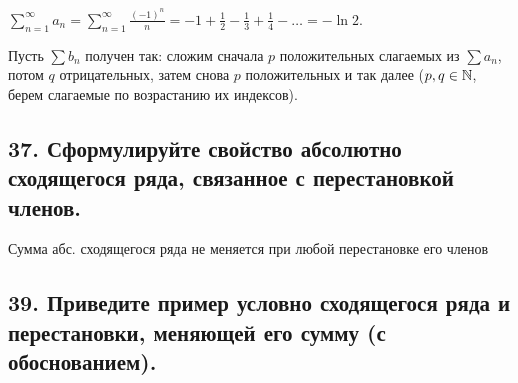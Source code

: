 \documentclass[a4paper, fleqn]{article}
\begin{document}
    $\displaystyle \sum_{n = 1}^{\infty} a_n = \sum_{n = 1}^{\infty} \frac{(-1)^n}{n} = -1 + \frac{1}{2} - \frac{1}{3} + \frac{1}{4} - \dots = -\ln 2.$
    
    Пусть $\sum b_n$ получен так: сложим сначала $p$ положительных слагаемых из $\sum a_n$, потом $q$ отрицательных, затем снова $p$ положительных и так далее ($p, q \in \mathbb{N}$, берем слагаемые по возрастанию их индексов).
    
    \subsection*{37. Сформулируйте свойство абсолютно сходящегося ряда, связанное с перестановкой членов.}
    \begin{proposition}
        Сумма абс. сходящегося ряда не меняется при любой перестановке его членов
    \end{proposition}
        
        
    \subsection*{39. Приведите пример условно сходящегося ряда и перестановки, меняющей его сумму
    (с обоснованием).}
    
\end{document}
